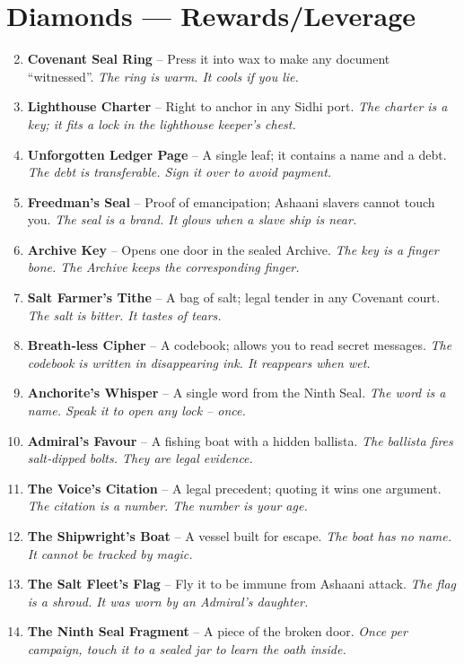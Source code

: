 \documentclass[11pt]{book}
\begin{document}
\section*{Diamonds — Rewards/Leverage}
\begin{enumerate}
\setcounter{enumi}{1}
\item \textbf{Covenant Seal Ring} – Press it into wax to make any document “witnessed”. \textit{The ring is warm. It cools if you lie.}
\item \textbf{Lighthouse Charter} – Right to anchor in any Sidhi port. \textit{The charter is a key; it fits a lock in the lighthouse keeper’s chest.}
\item \textbf{Unforgotten Ledger Page} – A single leaf; it contains a name and a debt. \textit{The debt is transferable. Sign it over to avoid payment.}
\item \textbf{Freedman’s Seal} – Proof of emancipation; Ashaani slavers cannot touch you. \textit{The seal is a brand. It glows when a slave ship is near.}
\item \textbf{Archive Key} – Opens one door in the sealed Archive. \textit{The key is a finger bone. The Archive keeps the corresponding finger.}
\item \textbf{Salt Farmer’s Tithe} – A bag of salt; legal tender in any Covenant court. \textit{The salt is bitter. It tastes of tears.}
\item \textbf{Breath‑less Cipher} – A codebook; allows you to read secret messages. \textit{The codebook is written in disappearing ink. It reappears when wet.}
\item \textbf{Anchorite’s Whisper} – A single word from the Ninth Seal. \textit{The word is a name. Speak it to open any lock – once.}
\item \textbf{Admiral’s Favour} – A fishing boat with a hidden ballista. \textit{The ballista fires salt‑dipped bolts. They are legal evidence.}
\item[J] \textbf{The Voice’s Citation} – A legal precedent; quoting it wins one argument. \textit{The citation is a number. The number is your age.}
\item[Q] \textbf{The Shipwright’s Boat} – A vessel built for escape. \textit{The boat has no name. It cannot be tracked by magic.}
\item[K] \textbf{The Salt Fleet’s Flag} – Fly it to be immune from Ashaani attack. \textit{The flag is a shroud. It was worn by an Admiral’s daughter.}
\item[A] \textbf{The Ninth Seal Fragment} – A piece of the broken door. \textit{Once per campaign, touch it to a sealed jar to learn the oath inside.}
\end{enumerate}
\end{document}
